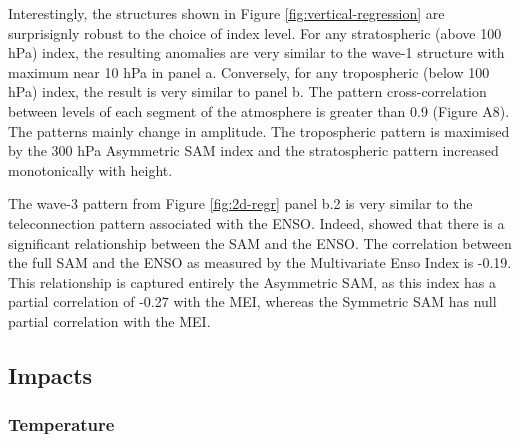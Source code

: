 \documentclass[]{ametsocV5}
\begin{document}
Interestingly, the structures shown in Figure
\ref{fig:vertical-regression} are surprisignly robust to the choice of
index level. For any stratospheric (above 100 hPa) index, the resulting
anomalies are very similar to the wave-1 structure with maximum near 10
hPa in panel a. Conversely, for any tropospheric (below 100 hPa) index,
the result is very similar to panel b. The pattern cross-correlation
between levels of each segment of the atmosphere is greater than 0.9
(Figure A8). The patterns mainly change in amplitude. The tropospheric
pattern is maximised by the 300 hPa Asymmetric SAM index and the
stratospheric pattern increased monotonically with height.

The wave-3 pattern from Figure \ref{fig:2d-regr} panel b.2 is very
similar to the teleconnection pattern associated with the ENSO. Indeed,
\citet{fogt2011} showed that there is a significant relationship between
the SAM and the ENSO. The correlation between the full SAM and the ENSO
as measured by the Multivariate Enso Index \citep{wolter2011} is -0.19.
This relationship is captured entirely the Asymmetric SAM, as this index
has a partial correlation of -0.27 with the MEI, whereas the Symmetric
SAM has null partial correlation with the MEI.

\subsection{Impacts}

\subsubsection{Temperature}
\end{document}
